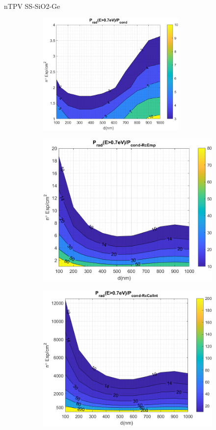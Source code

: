 \documentclass[spanish,a4paper]{beamer}%
\newcommand{\resRelPath}{\graphicspath{{./figuras/Resultados/RelacionCondRad/}}}
\begin{document}
\begin{frame}{nTPV SS-SiO2-Ge}
{			\resRelPath
			\vspace{-5pt}
			\begin{figure}[h]%
				\centering
				\begin{subfigure}[b]{0.48\textwidth}\centering
					\includegraphics[width=0.8\textwidth]{SS}%
				\end{subfigure}\hfill
				\begin{subfigure}[b]{0.48\textwidth}\centering
					\includegraphics[width=.8\textwidth]{SS_Rc_empirico}%
				\end{subfigure}\hfill
				\begin{subfigure}[b]{0.48\textwidth}\centering
					\includegraphics[width=.8\textwidth]{SS_Rc_Intermedio}%

\end{subfigure}
\end{figure}}
\end{frame}
\end{document}
